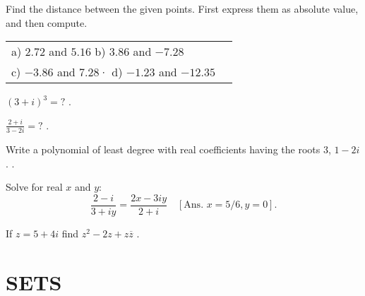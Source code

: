 \documentclass[11pt]{amsbook}
\begin{document}

\begin{exercise}
	Find the distance between the given points. 
	First express them as absolute value, and then compute.
\begin{center}
\begin{tabular}{ll}
	a) $2.72$ and $5.16$ \quad \quad b) $3.86$ and $-7.28$\\
	c) $-3.86$ and $7.28$· d) $-1.23$ and $-12.35$
\end{tabular}
\end{center}	
\end{exercise}
\begin{exercise}
	$(3 + i)^{3} = ?$ 
	\quad [Ans. $18 + 26 i$].
\end{exercise}
\begin{exercise}
	$\frac{2 + i}{3 - 2i} = ?$
	\quad [Ans. $(4 + 7 i) / 13$].
\end{exercise}
\begin{exercise}
	Write a polynomial of least degree with real coefficients 
	having the roots $3$, $1 - 2i$. 
	\quad [Ans. $x^{3}- 5 x^{2} + ll x - 15$].
\end{exercise}
\begin{exercise}
	Solve for real $x$ and $y$:
	\[
		\frac{2 - i}{3 + iy}
		= \frac{2x -3iy}{2 + i}
	\quad [\text{Ans. } x = 5/6, y = 0].
	\]
\end{exercise}
\begin{exercise}
	If $z = 5 + 4i$ find $z^{2} - 2 z + z \overline{z}$
	\quad [Ans. $60 + 32i$].
\end{exercise}




\section{SETS}
\label{sec:Sets}




\end{document}
